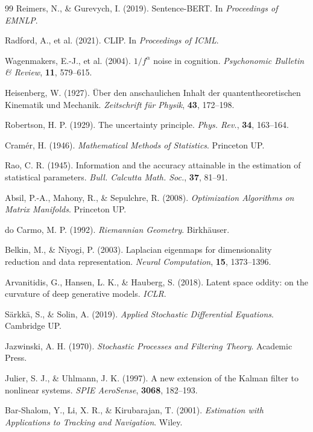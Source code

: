 \documentclass[10pt,a4paper,twocolumn]{article}
\theoremstyle{definition}
\theoremstyle{plain}
\begin{document}
\begin{thebibliography}{99}
Reimers, N., \& Gurevych, I. (2019). Sentence-BERT.
In \emph{Proceedings of EMNLP}.

Radford, A., et al. (2021). CLIP.
In \emph{Proceedings of ICML}.

Wagenmakers, E.-J., et al. (2004). $1/f^\alpha$ noise in cognition.
\emph{Psychonomic Bulletin \& Review}, \textbf{11}, 579–615.

Heisenberg, W. (1927). Über den anschaulichen Inhalt der quantentheoretischen Kinematik und Mechanik.
\emph{Zeitschrift für Physik}, \textbf{43}, 172–198.

Robertson, H. P. (1929). The uncertainty principle.
\emph{Phys. Rev.}, \textbf{34}, 163–164.

Cramér, H. (1946). \emph{Mathematical Methods of Statistics}. Princeton UP.

Rao, C. R. (1945). Information and the accuracy attainable in the estimation of statistical parameters.
\emph{Bull. Calcutta Math. Soc.}, \textbf{37}, 81–91.

Absil, P.-A., Mahony, R., \& Sepulchre, R. (2008).
\emph{Optimization Algorithms on Matrix Manifolds}. Princeton UP.

do Carmo, M. P. (1992). \emph{Riemannian Geometry}. Birkhäuser.

Belkin, M., \& Niyogi, P. (2003). Laplacian eigenmaps for dimensionality reduction and data representation.
\emph{Neural Computation}, \textbf{15}, 1373–1396.

Arvanitidis, G., Hansen, L. K., \& Hauberg, S. (2018).
Latent space oddity: on the curvature of deep generative models.
\emph{ICLR}.

Särkkä, S., \& Solin, A. (2019). \emph{Applied Stochastic Differential Equations}. Cambridge UP.

Jazwinski, A. H. (1970). \emph{Stochastic Processes and Filtering Theory}. Academic Press.

Julier, S. J., \& Uhlmann, J. K. (1997). A new extension of the Kalman filter to nonlinear systems.
\emph{SPIE AeroSense}, \textbf{3068}, 182–193.

Bar-Shalom, Y., Li, X. R., \& Kirubarajan, T. (2001).
\emph{Estimation with Applications to Tracking and Navigation}. Wiley.  %


\end{thebibliography}
\end{document}
